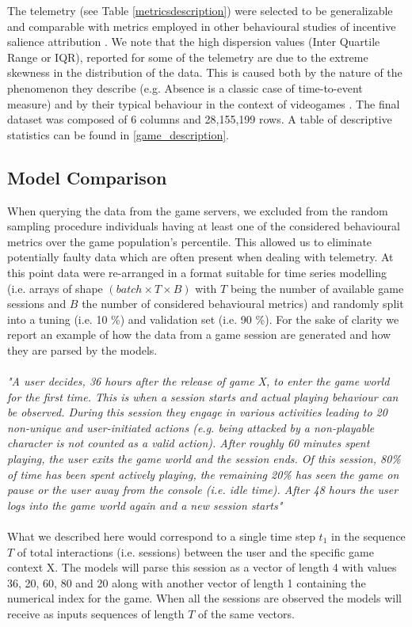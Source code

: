 The telemetry (see Table \ref{metricsdescription}) were selected to be generalizable and comparable with metrics employed in other behavioural studies of incentive salience attribution \cite{berridge1998role,mcclure2003computational,zhang2009neural}. We note that the high dispersion values (Inter Quartile Range  or IQR), reported for some of the telemetry are due to the extreme skewness in the distribution of the data. This is caused both by the nature of the phenomenon they describe (e.g. Absence is a classic case of time-to-event measure) and by their typical behaviour in the context of videogames \cite{bauckhage2012players}. The final dataset was composed of 6 columns and 28,155,199 rows. A table of descriptive statistics can be found in \ref{game_description}.



\subsection{Model Comparison}
When querying the data from the game servers, we excluded from the random sampling procedure individuals having at least one of the considered behavioural metrics over the game population's  percentile. This allowed us to eliminate potentially faulty data which are often present when dealing with telemetry. At this point data were re-arranged in a format suitable for time series modelling (i.e. arrays of shape $(batch\times T \times B)$ with $T$ being the number of available game sessions and $B$ the number of considered behavioural metrics) and randomly split into a tuning (i.e. 10 \%) and validation set (i.e. 90 \%). For the sake of clarity we report an example of how the data from a game session are generated and how they are parsed by the models.\\
\\
\textit{
"A user decides, 36 hours after the release of game X, to enter the game world for the first time. This is when a session starts and actual playing behaviour can be observed. During this session they engage in various activities leading to 20 non-unique and user-initiated actions (e.g. being attacked by a non-playable character is not counted as a valid action). After roughly 60 minutes spent playing, the user exits the game world and the session ends. Of this session, 80\% of time has been spent actively playing, the remaining 20\% has seen the game on pause or the user away from the console (i.e. idle time). After 48 hours the user logs into the game world again and a new session starts"}\\
\\
What we described here would correspond to a single time step $t_{1}$ in the sequence $T$ of total interactions (i.e. sessions) between the user and the specific game context X. The models will parse this session as a vector of length 4 with values 36, 20, 60, 80 and 20 along with another vector of length 1 containing the numerical index for the game. When all the sessions are observed the models will receive as inputs sequences of length $T$ of the same vectors. 

